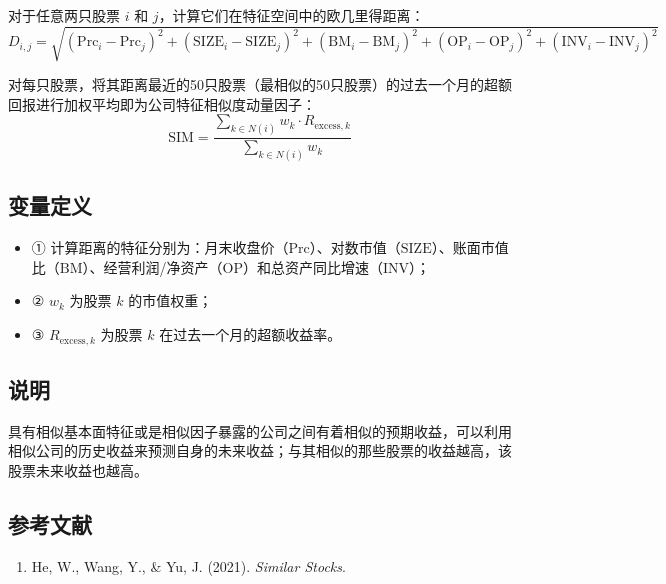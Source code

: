 \documentclass{article}
\begin{document}
对于任意两只股票 \(i\) 和 \(j\)，计算它们在特征空间中的欧几里得距离：
\begin{equation}
    D_{i,j} = \sqrt{(\mathrm{Prc}_i - \mathrm{Prc}_j)^2 + (\mathrm{SIZE}_i - \mathrm{SIZE}_j)^2 + (\mathrm{BM}_i - \mathrm{BM}_j)^2 + (\mathrm{OP}_i - \mathrm{OP}_j)^2 + (\mathrm{INV}_i - \mathrm{INV}_j)^2}
\end{equation}

对每只股票，将其距离最近的50只股票（最相似的50只股票）的过去一个月的超额回报进行加权平均即为公司特征相似度动量因子：
\begin{equation}
    \mathrm{SIM} = \frac{\sum_{k \in N(i)} w_k \cdot R_{\mathrm{excess},k}}{\sum_{k \in N(i)} w_k}
\end{equation}

\subsection{变量定义}
\begin{itemize}
    \item ① 计算距离的特征分别为：月末收盘价（\(\mathrm{Prc}\)）、对数市值（\(\mathrm{SIZE}\)）、账面市值比（\(\mathrm{BM}\)）、经营利润/净资产（\(\mathrm{OP}\)）和总资产同比增速（\(\mathrm{INV}\)）；
    \item ② \(w_k\) 为股票 \(k\) 的市值权重；
    \item ③ \(R_{\mathrm{excess},k}\) 为股票 \(k\) 在过去一个月的超额收益率。
\end{itemize}

\subsection{说明}
具有相似基本面特征或是相似因子暴露的公司之间有着相似的预期收益，可以利用相似公司的历史收益来预测自身的未来收益；与其相似的那些股票的收益越高，该股票未来收益也越高。

\subsection{参考文献}
\begin{enumerate}
    \item He, W., Wang, Y., \& Yu, J. (2021). \textit{Similar Stocks}.
\end{enumerate}
\end{document}

